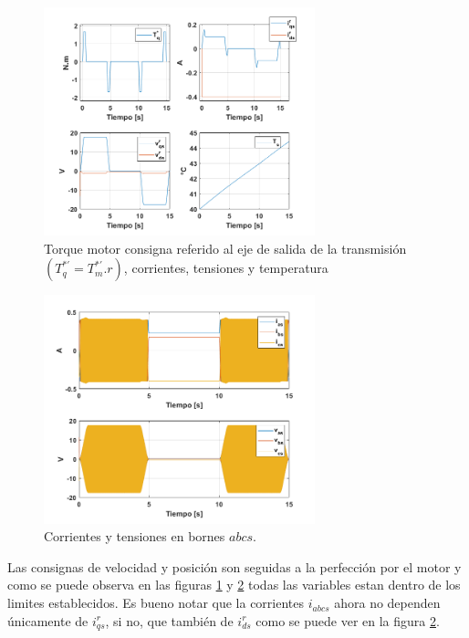 \documentclass[10pt]{article}
\begin{document}
\begin{itemize}
	\begin{figure}[h!]
		\centering
		\includegraphics[width=0.7\textwidth]{consignanuevapara.png}
		\caption{\label{fig:consignanuevapara}Torque motor consigna referido al eje de salida de la transmisión $(T^{*'}_{q}=T^{*'}_{m}.r)$, corrientes, tensiones y temperatura}
		\end{figure}
	\begin{figure}[h!]
	\centering
	\includegraphics[width=0.7\textwidth]{corten.png}
	\caption{\label{fig:corten}Corrientes y tensiones en bornes $abcs$.}
	\end{figure}
	Las consignas de velocidad y posición son seguidas a la perfección por el motor y como se puede observa en las figuras \ref{fig:consignanuevapara} y \ref{fig:corten} todas las variables estan dentro de los limites establecidos. Es bueno notar que la corrientes $i_{abcs}$ ahora no dependen únicamente de $i^{r}_{qs}$, si no, que también de $i^{r}_{ds}$ como se puede ver en la figura \ref{fig:corten}.
	 

\end{itemize}
\end{document}
